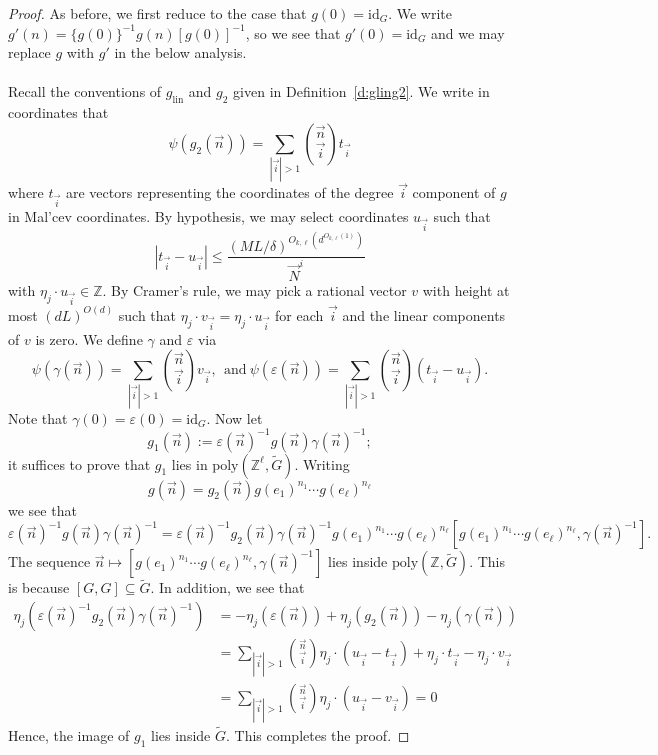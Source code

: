 \documentclass[11pt, a4paper]{amsart}
\theoremstyle{plain}
\theoremstyle{plain}
\theoremstyle{definition}
\theoremstyle{remark}
\numberwithin{equation}{section}
\numberwithin{lemma}{section}
\numberwithin{proposition}{section}
\numberwithin{corollary}{section}
\numberwithin{definition}{section}
\numberwithin{claim}{section}
\begin{document}
\begin{proof}
    As before, we first reduce to the case that $g(0) = \mathrm{id}_G$. We write $g'(n) = \{g(0)\}^{-1}g(n)[g(0)]^{-1}$, so we see that $g'(0) = \mathrm{id}_G$ and we may replace $g$ with $g'$ in the below analysis.\\\\
    Recall the conventions of $g_{\mathrm{lin}}$ and $g_2$ given in Definition~\ref{d:gling2}. We write in coordinates that
    $$\psi(g_2(\vec{n})) = \sum_{|\vec{i}| > 1} \binom{\vec{n}}{\vec{i}}t_{\vec{i}}$$
    where $t_{\vec{i}}$ are vectors representing the coordinates of the degree $\vec{i}$ component of $g$ in Mal'cev coordinates. By hypothesis, we may select coordinates $u_{\vec{i}}$ such that
    $$|t_{\vec{i}} - u_{\vec{i}}| \le \frac{(ML/\delta)^{O_{k, \ell}(d^{O_{k, \ell}(1)})}}{\vec{N}^i}$$
    with $\eta_j \cdot u_{\vec{i}} \in \mathbb{Z}$. By Cramer's rule, we may pick a rational vector $v$ with height at most $(dL)^{O(d)}$ such that $\eta_j \cdot v_{\vec{i}} = \eta_j \cdot u_{\vec{i}}$ for each $\vec{i}$ and the linear components of $v$ is zero. We define $\gamma$ and $\varepsilon$ via
    $$\psi(\gamma(\vec{n})) = \sum_{|\vec{i}| > 1} \binom{\vec{n}}{\vec{i}} v_{\vec{i}},~~\text{and}~\psi(\varepsilon(\vec{n})) = \sum_{|\vec{i}| > 1} \binom{\vec{n}}{\vec{i}}(t_{\vec{i}} - u_{\vec{i}}).$$
    Note that $\gamma(0) = \varepsilon(0) = \mathrm{id}_G$. Now let
    $$g_1(\vec{n}) := \varepsilon(\vec{n})^{-1}g(\vec{n})\gamma(\vec{n})^{-1};$$
    it suffices to prove that $g_1$ lies in $\mathrm{poly}(\mathbb{Z}^\ell, \tilde{G})$. Writing
    $$g(\vec{n}) = g_2(\vec{n})g(e_1)^{n_1} \cdots g(e_\ell)^{n_\ell}$$
    we see that
    $$\varepsilon(\vec{n})^{-1}g(\vec{n})\gamma(\vec{n})^{-1} = \varepsilon(\vec{n})^{-1}g_2(\vec{n})\gamma(\vec{n})^{-1}g(e_1)^{n_1} \cdots g(e_\ell)^{n_\ell}[g(e_1)^{n_1} \cdots g(e_\ell)^{n_\ell}, \gamma(\vec{n})^{-1}].$$
    The sequence $\vec{n} \mapsto [g(e_1)^{n_1} \cdots g(e_\ell)^{n_\ell}, \gamma(\vec{n})^{-1}]$ lies inside $\mathrm{poly}(\mathbb{Z}, \tilde{G})$. This is because $[G, G] \subseteq \tilde{G}$. In addition, we see that
    \begin{align*}
    \eta_j(\varepsilon(\vec{n})^{-1}g_2(\vec{n})\gamma(\vec{n})^{-1}) &= -\eta_j(\varepsilon(\vec{n})) + \eta_j(g_2(\vec{n})) - \eta_j(\gamma(\vec{n})) \\
    &= \sum_{|\vec{i}| > 1} \binom{\vec{n}}{\vec{i}} \eta_j \cdot (u_{\vec{i}} - t_{\vec{i}}) + \eta_j \cdot t_{\vec{i}} - \eta_j \cdot v_{\vec{i}} \\
    &= \sum_{|\vec{i}| > 1} \binom{\vec{n}}{\vec{i}} \eta_j \cdot (u_{\vec{i}} - v_{\vec{i}}) = 0
    \end{align*}
    Hence, the image of $g_1$ lies inside $\tilde{G}$. This completes the proof.
\end{proof}
\end{document}
